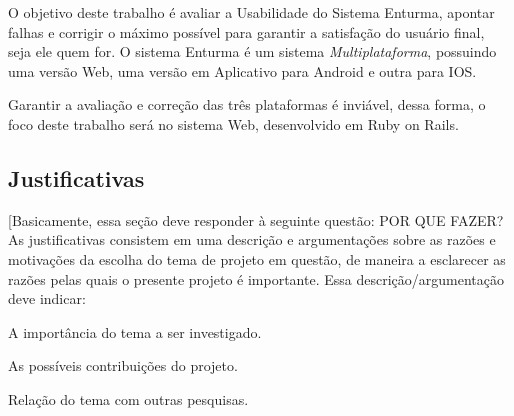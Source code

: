 	O objetivo deste trabalho é avaliar a Usabilidade do Sistema Enturma, apontar falhas e corrigir o máximo possível para garantir a satisfação do usuário final, seja ele quem for. O sistema Enturma é um sistema \textit{Multiplataforma}, possuindo uma versão Web, uma versão em Aplicativo para Android e outra para IOS.

	Garantir a avaliação e correção das três plataformas é inviável, dessa forma, o foco deste trabalho será no sistema Web, desenvolvido em Ruby on Rails.

\subsection{Justificativas}

	[Basicamente, essa seção deve responder à seguinte questão: POR QUE FAZER?
As justificativas consistem em uma descrição e argumentações sobre as razões e motivações da escolha do tema de projeto em questão, de maneira a esclarecer as razões pelas quais o presente projeto é importante.
Essa descrição/argumentação deve indicar:

A importância do tema a ser investigado.

As possíveis contribuições do projeto.

Relação do tema com outras pesquisas.